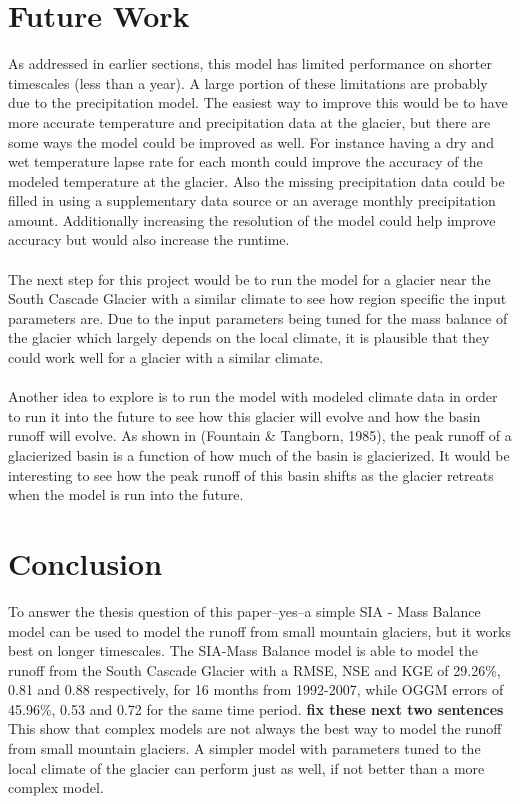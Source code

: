 \documentclass{article}
\begin{document}
\section{Future Work}
As addressed in earlier sections, this model has limited performance on shorter timescales (less than a year). A large portion of these limitations 
are probably due to the precipitation model. The easiest way to improve this would be to have more accurate temperature and precipitation data at the glacier, but 
there are some ways the model could be improved as well. For instance having a dry and wet temperature lapse rate for each month could improve the accuracy of the modeled 
temperature at the glacier. Also the missing precipitation data could be filled in using a supplementary data source or an average monthly precipitation amount.
Additionally increasing the resolution of the model could help improve accuracy but would also increase the runtime.
\paragraph{}
The next step for this project would be to run the model for a glacier near the South Cascade Glacier with a similar climate to see how region specific the input 
parameters are. Due to the input parameters being tuned for the mass balance of the glacier which largely depends on the local climate, it 
is plausible that they could work well for a glacier with a similar climate.
\paragraph{}
Another idea to explore is to run the model with modeled climate data in order to run it into the future to see how this glacier 
will evolve and how the basin runoff will evolve. As shown in (Fountain \& Tangborn, 1985), the peak runoff of a glacierized basin is a function of 
how much of the basin is glacierized. It would be interesting to see how the peak runoff of this basin shifts as the glacier retreats when the model 
is run into the future.
\section{Conclusion}
To answer the thesis question of this paper--yes--a simple SIA - Mass Balance model can be used to model the runoff from small mountain glaciers, but 
it works best on longer timescales.
The SIA-Mass Balance model is able to model the runoff from the South Cascade Glacier with a RMSE, NSE and KGE of 29.26\%, 0.81 and 0.88 respectively, 
for 16 months from 1992-2007, while OGGM errors of 45.96\%, 0.53 and 0.72 for the same time period. 
\textbf{fix these next two sentences}
This show that complex models are not always 
the best way to model the runoff from small mountain glaciers. A simpler model with parameters tuned to the local climate of the glacier can 
perform just as well, if not better than a more complex model. 
\end{document}
